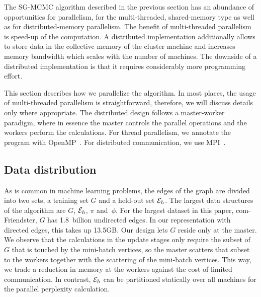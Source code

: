 \begin{comment}
- pi storage: DKV
   . pi/phi is read in 3), 4), 5a), 7)
   . pi is written in 4); read[i], then write[i], so no other data dependencies
   . so access is very synchronous: either read-only, or write without
     concurrent readers
   . DKV store properties:
      - single-sized keys
      - contiguous key space (integers 0..N-1)
      - update-only writes: no new KVs, no deletes
     so: no load imbalance, no hashing that is worth its name
      - no read/write or write/write concurrency
     so:
      - build RDMA store with remote reads and remote writes only, with exactly
        one RDMA transaction per read or write
\end{comment}



The SG-MCMC algorithm described in the previous section has an abundance of
opportunities for parallelism, for the multi-threaded, shared-memory type as
well as for distributed-memory parallelism. The benefit of multi-threaded
parallelism is speed-up of the computation. A distributed implementation
additionally allows to store data in the collective memory of the cluster
machine and increases memory bandwidth which scales with the number of
machines. The downside of a distributed implementation is that it requires
considerably more programming effort.


This section describes how we parallelize the algorithm.
In most places, the usage of multi-threaded parallelism
is straightforward, therefore, we will discuss details only where appropriate. The
distributed design follows a master-worker paradigm, where in essence
the master controls the parallel operations and the workers perform the
calculations. For thread parallelism, we annotate the program with
OpenMP~\cite{OpenMPSpec}. For distributed communication, we use
MPI~\cite{Forum:1994:MMI:898758}.


\subsection{Data distribution}

As is common in machine learning problems, the edges of the graph are divided
into two sets, a training set $G$ and a held-out set $\cE_h$.
The largest data structures of the algorithm are $G$, $\cE_h$, $\pi$ and~$\phi$.
For the largest dataset in this paper, com-Friendster, $G$ has 1.8~billion
undirected edges. In our representation with directed edges, this takes
up 13.5GB. Our design lets $G$ reside only at the master. We observe that
the calculations in the update stages only require the subset of $G$ that
is touched by the mini-batch vertices, so the master scatters that subset to
the workers together with the scattering of the mini-batch vertices. This way,
we trade a reduction in memory at the workers against the cost of limited
communication. In contrast, $\cE_h$ can be partitioned statically over all
machines for the parallel perplexity calculation.

